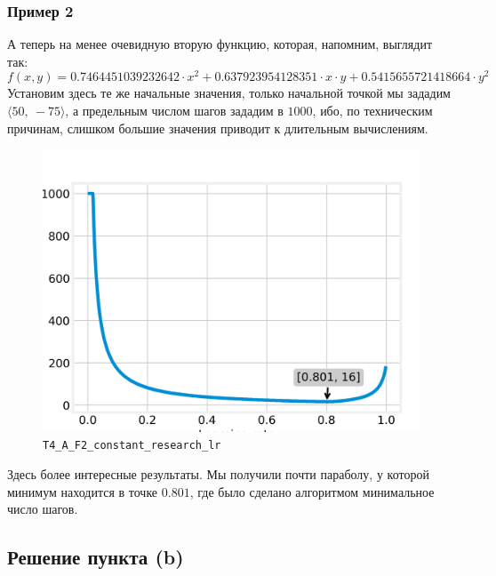 \documentclass[12pt, a4paper, oneside, final]{article}
\begin{document}
	\subsubsection*{Пример 2}
	А теперь на менее очевидную вторую функцию, которая, напомним, выглядит так:
	\[
		f(x, y) = 0.7464451039232642 \cdot x^{2} + 0.637923954128351 \cdot x \cdot y + 0.5415655721418664 \cdot y^{2}
	\]
	Установим здесь те же начальные значения, только начальной точкой мы зададим $\langle 50, ~ -75 \rangle$, а предельным числом шагов зададим в $1000$, ибо, по техническим причинам, слишком большие значения приводит к длительным вычислениям.
	\begin{figure}[H]
		\centering
		\includegraphics[scale=0.68]{Image/T4_A_F2_constant_research_lr.png}
		\caption*{\texttt{T4\_A\_F2\_constant\_research\_lr}}
	\end{figure}
	Здесь более интересные результаты. Мы получили почти параболу, у которой минимум находится в точке $0.801$, где было сделано алгоритмом минимальное число шагов.
	\subsection*{Решение пункта (b)}
\end{document}
